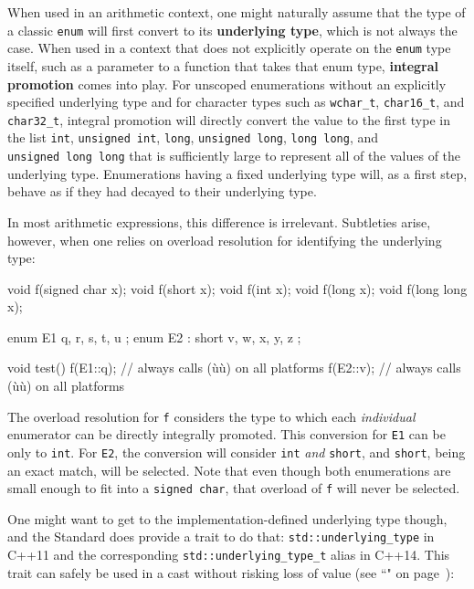 When used in an arithmetic context, one might naturally assume that the
type of a classic \texttt{enum} will first convert to its
\textbf{underlying type}, which is not always the case. When used in a
context that does not explicitly operate on the \texttt{enum} type
itself, such as a parameter to a function that takes that enum type,
\textbf{integral promotion} comes into play. For unscoped enumerations
without an explicitly specified underlying type and for character types
such as \texttt{wchar\_t}, \texttt{char16\_t}, and \texttt{char32\_t},
integral promotion will directly convert the value to the first type in
the list \texttt{int}, \texttt{unsigned}~\texttt{int}, \texttt{long},
\texttt{unsigned}~\texttt{long}, \texttt{long}~\texttt{long}, and
\texttt{unsigned}~\texttt{long}~\texttt{long} that is sufficiently large
to represent all of the values of the underlying type. Enumerations
having a fixed underlying type will, as a first step, behave as if they
had decayed to their underlying type.

In most arithmetic expressions, this difference is irrelevant.
Subtleties arise, however, when one relies on overload resolution for
identifying the underlying type:

\begin{emcppslisting}[emcppsbatch=e2]
void f(signed char x);
void f(short x);
void f(int x);
void f(long x);
void f(long long x);

enum E1         { q, r, s, t, u };
enum E2 : short { v, w, x, y, z };

void test()
{
   f(E1::q);  // always calls (ù{}ù) on all platforms
   f(E2::v);  // always calls (ù{}ù) on all platforms
}
\end{emcppslisting}

\noindent The overload resolution for \texttt{f} considers the type to which each
\emph{individual} enumerator can be directly integrally promoted. This
conversion for \texttt{E1} can be only to \texttt{int}. For \texttt{E2},
the conversion will consider \texttt{int} \emph{and} \texttt{short}, and
\texttt{short}, being an exact match, will be selected. Note that even
though both enumerations are small enough to fit into a
\texttt{signed}~\texttt{char}, that overload of \texttt{f} will never be
selected.

One might want to get to the implementation-defined underlying type
though, and the Standard does provide a trait to do that:
\texttt{std::underlying\_type} in C++11 and the corresponding
\texttt{std::underlying\_type\_t} alias in C++14. This trait can safely
be used in a cast without risking loss of value (see
  ``" on page~\pageref{auto}):

